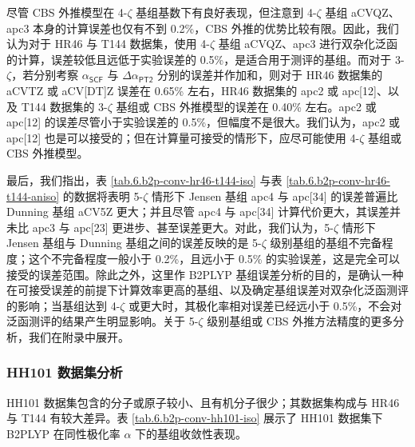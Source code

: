 尽管 CBS 外推模型在 4-$\zeta$ 基组基数下有良好表现，但注意到 4-$\zeta$ 基组 aCVQZ、apc3 本身的计算误差也仅有不到 0.2\%，CBS 外推的优势比较有限。因此，我们认为对于 HR46 与 T144 数据集，使用 4-$\zeta$ 基组 aCVQZ、apc3 进行双杂化泛函的计算，误差较低且远低于实验误差的 0.5\%，是适合用于测评的基组。而对于 3-$\zeta$，若分别考察 $\alpha_\textsf{SCF}$ 与 $\Delta \alpha_\textsf{PT2}$ 分别的误差并作加和，则对于 HR46 数据集的 aCVTZ 或 aCV[DT]Z 误差在 0.65\% 左右，HR46 数据集的 apc2 或 apc[12]、以及 T144 数据集的 3-$\zeta$ 基组或 CBS 外推模型的误差在 0.40\% 左右。apc2 或 apc[12] 的误差尽管小于实验误差的 0.5\%，但幅度不是很大。我们认为，apc2 或 apc[12] 也是可以接受的；但在计算量可接受的情形下，应尽可能使用 4-$\zeta$ 基组或 CBS 外推模型。

最后，我们指出，表 \ref{tab.6.b2p-conv-hr46-t144-iso} 与表 \ref{tab.6.b2p-conv-hr46-t144-aniso} 的数据将表明 5-$\zeta$ 情形下 Jensen 基组 apc4 与 apc[34] 的误差普遍比 Dunning 基组 aCV5Z 更大；并且尽管 apc4 与 apc[34] 计算代价更大，其误差并未比 apc3 与 apc[23] 更进步、甚至误差更大。对此，我们认为，5-$\zeta$ 情形下 Jensen 基组与 Dunning 基组之间的误差反映的是 5-$\zeta$ 级别基组的基组不完备程度；这个不完备程度一般小于 0.2\%，且远小于 0.5\% 的实验误差，这是完全可以接受的误差范围。除此之外，这里作 B2PLYP 基组误差分析的目的，是确认一种在可接受误差的前提下计算效率更高的基组、以及确定基组误差对双杂化泛函测评的影响；当基组达到 4-$\zeta$ 或更大时，其极化率相对误差已经远小于 0.5\%，不会对泛函测评的结果产生明显影响。关于 5-$\zeta$ 级别基组或 CBS 外推方法精度的更多分析，我们在\alert{附录}中展开。

\subsubsection{HH101 数据集分析}

HH101 数据集包含的分子或原子较小、且有机分子很少；其数据集构成与 HR46 与 T144 有较大差异。表 \ref{tab.6.b2p-conv-hh101-iso} 展示了 HH101 数据集下 B2PLYP 在同性极化率 $\alpha$ 下的基组收敛性表现。

